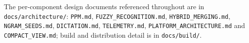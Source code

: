 \documentclass[11pt,a4paper]{article}
\begin{document}
The per-component design documents referenced throughout are in
\texttt{docs/architecture/}: \texttt{PPM.md}, \texttt{FUZZY\_RECOGNITION.md},
\texttt{HYBRID\_MERGING.md}, \texttt{NGRAM\_SEEDS.md}, \texttt{DICTATION.md},
\texttt{TELEMETRY.md}, \texttt{PLATFORM\_ARCHITECTURE.md} and
\texttt{COMPACT\_VIEW.md}; build and distribution detail is in
\texttt{docs/build/}.
\end{document}
